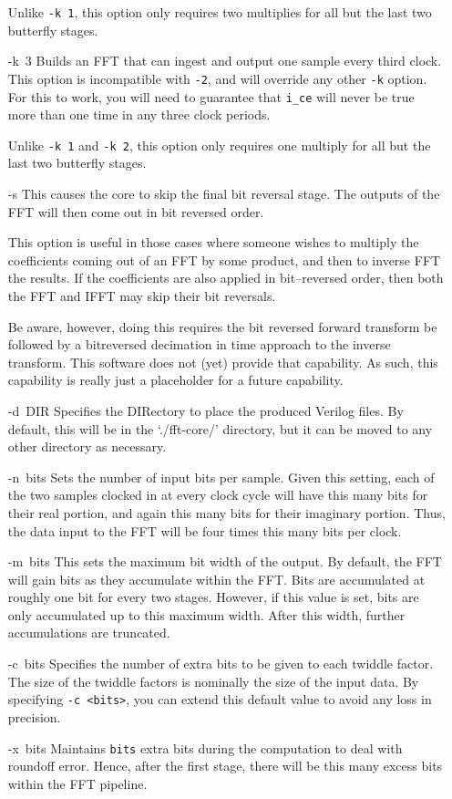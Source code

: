 \documentclass{gqtekspec}
\begin{document}
\begin{itemize}
	Unlike {\tt -k 1}, this option only requires two multiplies for all
	but the last two butterfly stages.

\item[\hbox{-k 3}]
	Builds an FFT that can ingest and output one sample every third clock.
	This option is incompatible with {\tt -2}, and will override any
	other {\tt -k} option.
	For this to work, you will need to guarantee that {\tt i\_ce} will
	never be true more than one time in any three clock periods.

	Unlike {\tt -k 1} and {\tt -k 2}, this option only requires one
	multiply for all but the last two butterfly stages.

\item[\hbox{-s}]
	This causes the core to skip the final bit reversal stage.  The 
	outputs of the FFT will then come out in bit reversed order.

	This option is useful in those cases where someone wishes to 
	multiply the coefficients coming out of an FFT by some product,
	and then to inverse FFT the results.  If the coefficients are also
	applied in bit--reversed order, then both the FFT and IFFT may
	skip their bit reversals.

	Be aware, however, doing this requires the bit reversed forward
	transform be followed by a bitreversed decimation in time approach
	to the inverse transform.  This software does not (yet) provide that
	capability.  As such, this capability is really just a placeholder for
	a future capability.
\item[\hbox{-d DIR}]
	Specifies the DIRectory to place the produced Verilog files.  By
	default, this will be in the `./fft-core/' directory, but it can
	be moved to any other directory as necessary.
\item[\hbox{-n bits}] Sets the number of input bits per sample.  Given this
	setting, each of the two samples clocked in at every clock cycle
	will have this many bits for their real portion, and again this many
	bits for their imaginary portion.  Thus, the data input to the
	FFT will be four times this many bits per clock.
\item[\hbox{-m bits}] This sets the maximum bit width of the output.
	By default, the FFT will gain bits as they accumulate within
	the FFT.  Bits are accumulated at roughly one bit for every two stages.
	However, if this value is set, bits are only accumulated up to this
	maximum width.  After this width, further accumulations are truncated.
\item[\hbox{-c bits}] Specifies the number of extra bits to be given to each
	twiddle factor.  The size of the twiddle factors is nominally the size
	of the input data.  By specifying {\tt -c <bits>}, you can extend
	this default value to avoid any loss in precision.
\item[\hbox{-x bits}]  Maintains {\tt bits} extra bits during the computation
	to deal with roundoff error.  Hence, after the first stage, there will
	be this many excess bits within the FFT pipeline.


\end{itemize}
\end{document}
